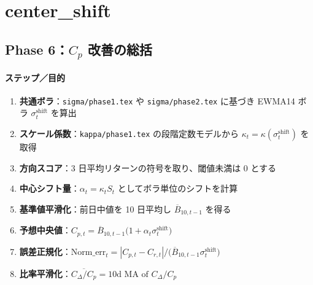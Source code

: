 
\section*{center\_shift}\nopagebreak[4]

\subsection*{Phase 6：$C_p$ 改善の総括}\nopagebreak[4]
\paragraph{ステップ／目的}
\begin{flushleft}
\begin{enumerate}
  \item \textbf{共通ボラ}：{\scriptsize\verb|sigma/phase1.tex|} や {\scriptsize\verb|sigma/phase2.tex|} に基づき
        EWMA14 ボラ \(\sigma_t^{\mathrm{shift}}\) を算出
  \item \textbf{スケール係数}：{\scriptsize\verb|kappa/phase1.tex|} の段階定数モデルから
        \(\kappa_t=\kappa(\sigma_t^{\mathrm{shift}})\) を取得
  \item \textbf{方向スコア}：3 日平均リターンの符号を取り、閾値未満は 0 とする
  \item \textbf{中心シフト量}：\(\alpha_t=\kappa_t S_t\) としてボラ単位のシフトを計算
  \item \textbf{基準値平滑化}：前日中値を 10 日平均し \(\overline{B}_{10,t-1}\) を得る
  \item \textbf{予想中央値}：\(C_{p,t}=\overline{B}_{10,t-1}\bigl(1+\alpha_t\sigma_t^{\mathrm{shift}}\bigr)\)
  \item \textbf{誤差正規化}：\(\mathrm{Norm\_err}_t=|C_{p,t}-C_{r,t}|\big/\bigl(\overline{B}_{10,t-1}\sigma_t^{\mathrm{shift}}\bigr)\)
  \item \textbf{比率平滑化}：\(\overline{C_\Delta/C_p}=\text{10d MA of }C_\Delta/C_p\)
\end{enumerate}
\end{flushleft}

